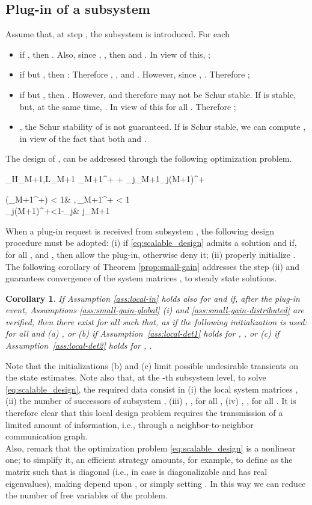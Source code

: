 \documentclass[journal,10pt,draftcls,onecolumn]{IEEEtran}
\newtheorem{corollary}{Corollary}
\begin{document}
\subsection{Plug-in of a subsystem}
Assume that, at step , the subsystem  is introduced. For each 
\begin{itemize}
\item if , then . Also, since , , then  and . In view of this, ;
\item if  but , then : Therefore , , and . However, since , . Therefore
;

\item if  but , then . However,  and therefore  may not be Schur stable. If  is stable,  but, at the same time, . In view of this  for all . Therefore
;
\item , the Schur stability of  is not guaranteed. If  is Schur stable, we can compute , in view of the fact that both  and .
\end{itemize}
The design of ,  can be addressed through the following optimization problem.

\min_{H_{M+1},L_{M+1}} \rho_{M+1}^+ + \sum_{j\in {}_{M+1}}\gamma_{j(M+1)}^+

\sigma(_{M+1}^+) < 1&
,\,\rho_{M+1}^+ < 1\\
\gamma_{j(M+1)}^+<1-\rho_j& j\in {}_{M+1}

When a plug-in request is received from subsystem , the following design procedure must be adopted: (i) if \eqref{eq:scalable_design} admits a solution and if, for all ,  and , then allow the plug-in, otherwise deny it; (ii) properly initialize .\\
The following corollary of Theorem \ref{prop:small-gain} addresses the step (ii) and guarantees convergence of the system matrices ,  to steady state solutions.
\begin{corollary}
\label{cor:small-gain-Plugin}
If Assumption \ref{ass:local-in} holds also for  and if, after the plug-in event, Assumptions \ref{ass:small-gain-global} (i) and \ref{ass:small-gain-distributed} are verified,
then there exist  for all  such that,  as  if the following initialization is used:  for all  and (a) , or (b) if Assumption~\ref{ass:local-det1} holds for , , or (c) if Assumption~\ref{ass:local-det2} holds for , .\hfill
\end{corollary}
Note that the initializations (b) and (c) limit possible undesirable transients on the state estimates.
Note also that, at the -th subsystem level, to solve \eqref{eq:scalable_design}, the required data consist in (i) the local system matrices , (ii) the number  of successors of subsystem , (iii) , ,  for all , (iv) , ,  for all . It is therefore clear that this local design problem requires the transmission of a limited amount of information, i.e., through a neighbor-to-neighbor communication graph.\\
Also, remark that the optimization problem \eqref{eq:scalable_design} is a nonlinear one; to simplify it, an efficient strategy amounts, for example, to define  as the matrix such that  is diagonal (i.e., in case  is diagonalizable and has real eigenvalues), making  depend upon , or simply setting . In this way we can reduce the number of free variables of the problem.
\end{document}
